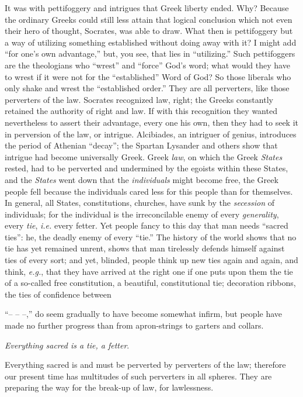 \documentclass[12pt,a4paper]{book}
\begin{document}
It was with pettifoggery and intrigues that Greek liberty ended. Why? Because 
the ordinary Greeks could still less attain that logical conclusion which not 
even their hero of thought, Socrates, was able to draw. What then is 
pettifoggery but a way of utilizing something established without doing away 
with it? I might add ``for one's own advantage,'' but, you see, that lies in 
``utilizing.'' Such pettifoggers are the theologians who ``wrest'' and 
``force'' God's word; what would they have to wrest if it were not for the 
``established'' Word of God? So those liberals who only shake and wrest the 
``established order.'' They are all perverters, like those perverters of the 
law. Socrates recognized law, right; the Greeks constantly retained the 
authority of right and law. If with this recognition they wanted nevertheless 
to assert their advantage, every one his own, then they had to seek it in 
perversion of the law, or intrigue. Alcibiades, an intriguer of genius, 
introduces the period of Athenian ``decay''; the Spartan Lysander and others 
show that intrigue had become universally Greek. Greek \textit{law}, on which 
the Greek \textit{States} rested, had to be perverted and undermined by the 
egoists within these States, and the \textit{States} went down that the 
\textit{individuals} might become free, the Greek people fell because the 
individuals cared less for this people than for themselves. In general, all 
States, constitutions, churches, have sunk by the \textit{secession} of 
individuals; for the individual is the irreconcilable enemy of every 
\textit{generality}, every \textit{tie}, \textit{i.e.} every fetter. Yet 
people fancy to this day that man needs ``sacred ties'': he, the deadly 
enemy of every ``tie.'' The history of the world shows that no tie has yet 
remained unrent, shows that man tirelessly defends himself against ties of 
every sort; and yet, blinded, people think up new ties again and again, and 
think, \textit{e.g.}, that they have arrived at the right one if one puts upon 
them the tie of a so-called free constitution, a beautiful, constitutional 
tie; decoration ribbons, the ties of confidence between

``-- -- --,'' do seem gradually to have become somewhat infirm, but people 
have made no further progress than from apron-strings to garters and collars.

\textit{Everything sacred is a tie, a fetter}.

Everything sacred is and must be perverted by perverters of the law; therefore 
our present time has multitudes of such perverters in all spheres. They are 
preparing the way for the break-up of law, for lawlessness.
\end{document}
